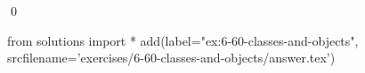 
\begin{ex}
  \label{ex:6-60-classes-and-objects}
  
  \qed
\end{ex}
\begin{python0}
from solutions import *
add(label="ex:6-60-classes-and-objects",
    srcfilename='exercises/6-60-classes-and-objects/answer.tex')
\end{python0}
